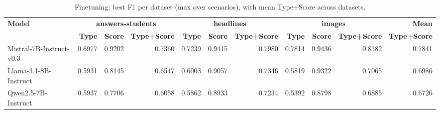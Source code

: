 \begin{table}[t]
\centering
\scriptsize
\setlength{\tabcolsep}{3.2pt}
\begin{adjustbox}{width=\textwidth}
\begin{tabular}{l r r r r r r r r r r}
\hline
\textbf{Model} & \multicolumn{3}{c}{\textbf{answers-students}} & \multicolumn{3}{c}{\textbf{headlines}} & \multicolumn{3}{c}{\textbf{images}} & \textbf{Mean} \\
 & \textbf{Type} & \textbf{Score} & \textbf{Type+Score} & \textbf{Type} & \textbf{Score} & \textbf{Type+Score} & \textbf{Type} & \textbf{Score} & \textbf{Type+Score} & \textbf{Type+Score} \\
\hline
Mistral-7B-Instruct-v0.3 & 0.6977 & 0.9202 & 0.7360 & 0.7239 & 0.9415 & 0.7980 & 0.7814 & 0.9436 & 0.8182 & 0.7841 \\
Llama-3.1-8B-Instruct & 0.5931 & 0.8145 & 0.6547 & 0.6003 & 0.9057 & 0.7346 & 0.5819 & 0.9322 & 0.7065 & 0.6986 \\
Qwen2.5-7B-Instruct & 0.5937 & 0.7706 & 0.6058 & 0.5862 & 0.8933 & 0.7234 & 0.5392 & 0.8798 & 0.6885 & 0.6726 \\
\hline
\end{tabular}
\end{adjustbox}
\caption{Finetuning: best F1 per dataset (max over scenarios), with mean Type+Score across datasets.}
\end{table}